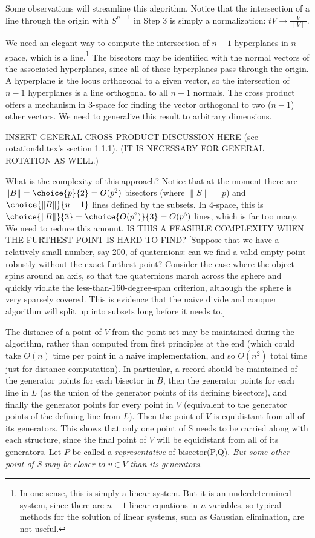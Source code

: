 \documentclass[12pt]{article}
\begin{document}
Some observations will streamline this algorithm.
Notice that the intersection of a line through the origin with $S^{n-1}$ in Step 3
is simply a normalization: $tV \rightarrow \frac{V}{\|V\|}$.

We need an elegant way to compute the intersection of $n-1$ hyperplanes in
$n$-space, which is a line.\footnote{In one sense, this is simply a linear system.  
  But it is an underdetermined system,
  since there are $n-1$ linear equations in $n$ variables, 
  so typical methods for the solution of linear systems, such as Gaussian elimination,
  are not useful.}
The bisectors may be identified with the normal vectors of the associated hyperplanes,
since all of these hyperplanes pass through the origin.
A hyperplane is the locus orthogonal to a given vector,
so the intersection of $n-1$ hyperplanes is a line orthogonal to all $n-1$ normals.
The cross product offers a mechanism in 3-space for finding the vector orthogonal
to two ($n-1$) other vectors.
We need to generalize this result to arbitrary dimensions.

INSERT GENERAL CROSS PRODUCT DISCUSSION HERE (see rotation4d.tex's section 1.1.1).
(IT IS NECESSARY FOR GENERAL ROTATION AS WELL.)

What is the complexity of this approach?
Notice that at the moment there are $\|B\| = \choice{p}{2} = O(p^2)$ bisectors
(where $\|S\| = p$) and 
$\choice{\|B\|}{n-1}$ lines defined by the subsets.
In 4-space, this is $\choice{\|B\|}{3} = \choice{O(p^2)}{3} = O(p^6)$ lines,
which is far too many.
We need to reduce this amount.
IS THIS A FEASIBLE COMPLEXITY WHEN THE FURTHEST POINT IS HARD TO FIND?
[Suppose that we have a relatively small number, say 200, of quaternions: can we find 
a valid empty point robustly without the exact furthest point?
Consider the case where the object spins around an axis, so that the quaternions
march across the sphere and quickly violate the less-than-160-degree-span criterion,
although the sphere is very sparsely covered.
This is evidence that the naive divide and conquer algorithm will split up into subsets
long before it needs to.]

The distance of a point of $V$ from the point set may be maintained during the algorithm,
rather than computed from first principles at the end (which could take $O(n)$ time
per point in a naive implementation, and so $O(n^2)$ total time just 
for distance computation).
In particular, a record should be maintained of the generator points 
for each bisector in $B$, 
then the generator points for each line in $L$ (as the union of the generator points
of its defining bisectors), and finally the generator points for every point in $V$
(equivalent to the generator points of the defining line from $L$).
Then the point of $V$ is equidistant from all of its generators.
This shows that only one point of S needs to be carried along with each structure,
since the final point of $V$ will be equidistant from all of its generators.
Let $P$ be called a {\em representative} of bisector(P,Q).
{\em But some other point of S may be closer to $v \in V$ than its generators.}
\end{document}

